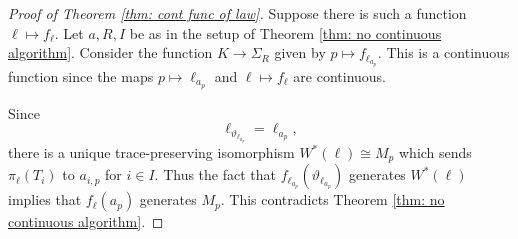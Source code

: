 \documentclass[10pt]{amsart}
\theoremstyle{definition}
\numberwithin{equation}{section}
\begin{document}
\begin{proof}[Proof of Theorem \ref{thm: cont func of law}]
Suppose there is such a function $\ell\mapsto f_{\ell}$. Let $a,R,I$ be as in the setup of Theorem \ref{thm: no continuous algorithm}. Consider the function $K\to \Sigma_{R}$ given by $p\mapsto f_{\ell_{a_{p}}}$. This is a continuous function since the maps $p\mapsto \ell_{a_{p}}$ and $\ell\mapsto f_{\ell}$ are continuous. 

Since 
\[\ell_{\vartheta_{\ell_{a_{p}}}}=\ell_{a_{p}},\]
there is a unique trace-preserving isomorphism $W^{*}(\ell)\cong M_{p}$ which sends $\pi_{\ell}(T_{i})$ to $a_{i,p}$ for $i\in I$. Thus the fact that $f_{\ell_{a_{p}}}(\vartheta_{\ell_{a_{p}}})$ generates $W^{*}(\ell)$ implies that $f_{\ell}(a_{p})$ generates $M_{p}$. This contradicts Theorem \ref{thm: no continuous algorithm}.





\end{proof}
\end{document}
